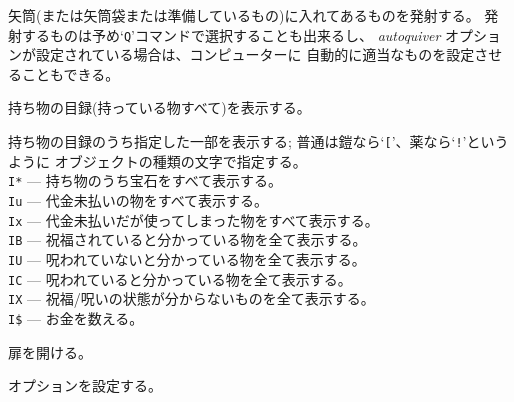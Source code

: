 矢筒(または矢筒袋または準備しているもの)に入れてあるものを発射する。
発射するものは予め`{\tt Q}'コマンドで選択することも出来るし、
{\it autoquiver\/} オプションが設定されている場合は、コンピューターに
自動的に適当なものを設定させることもできる。
\item[\tb{i}]
持ち物の目録(持っている物すべて)を表示する。
\item[\tb{I}]
持ち物の目録のうち指定した一部を表示する; 普通は鎧なら`{\tt [}'、薬なら`{\tt !}'というように
オブジェクトの種類の文字で指定する。\\
{\tt I*} --- 持ち物のうち宝石をすべて表示する。\\
{\tt Iu} --- 代金未払いの物をすべて表示する。\\
{\tt Ix} --- 代金未払いだが使ってしまった物をすべて表示する。\\
{\tt IB} --- 祝福されていると分かっている物を全て表示する。\\
{\tt IU} --- 呪われていないと分かっている物を全て表示する。\\
{\tt IC} --- 呪われていると分かっている物を全て表示する。\\
{\tt IX} --- 祝福/呪いの状態が分からないものを全て表示する。\\
{\tt I\$} --- お金を数える。
\item[\tb{o}]
扉を開ける。
\item[\tb{O}]
オプションを設定する。\\
